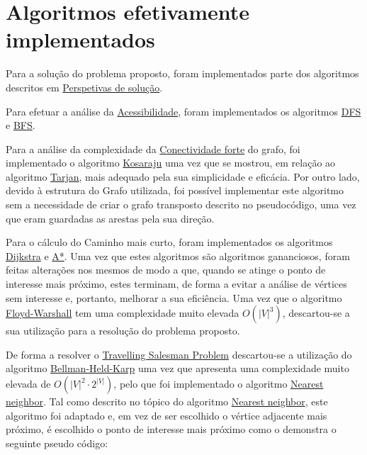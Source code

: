 \documentclass[12pt,a4paper]{report}
\begin{document}
\chapter{Algoritmos efetivamente implementados}
\label{implementedAlgos}
Para a solução do problema proposto, foram implementados parte dos algoritmos descritos em \hyperref[perspetivas]{Perspetivas de solução}. \par

Para efetuar a análise da \hyperref[perspetivas:acessibilidade]{Acessibilidade}, foram implementados os algoritmos \hyperref[algo:dfs]{DFS} e \hyperref[algo:bfs]{BFS}. \par

Para a análise da complexidade da \hyperref[perspetivas:conectividadeforte]{Conectividade forte} do grafo, foi implementado o algoritmo \hyperref[algo:kosaraju]{Kosaraju} uma vez que 
se mostrou, em relação ao algoritmo \hyperref[algo:tarjan]{Tarjan}, mais adequado pela sua simplicidade e eficácia. Por outro lado, devido à
estrutura do Grafo utilizada, foi possível implementar este algoritmo sem a necessidade de criar o grafo transposto descrito no pseudocódigo,
uma vez que eram guardadas as arestas pela sua direção. \par

Para o cálculo do Caminho mais curto, foram implementados os algoritmos \hyperref[algo:dijkstra]{Dijkstra} e \hyperref[algo:astar]{A*}. 
Uma vez que estes algoritmos são algoritmos gananciosos, foram feitas alterações nos mesmos de modo a que, quando se atinge o ponto de
interesse mais próximo, estes terminam, de forma a evitar a análise de vértices sem interesse e, portanto, melhorar a sua eficiência.
Uma vez que o algoritmo \hyperref[algo:floydwarshall]{Floyd-Warshall} tem uma complexidade muito elevada \( O(|V|^3) \), descartou-se a sua utilização
para a resolução do problema proposto. \par

De forma a resolver o \hyperref[perspetivas:tsp]{Travelling Salesman Problem} descartou-se a utilização do algoritmo \hyperref[algo:bellmanheldkarp]{Bellman-Held-Karp} uma vez que apresenta
uma complexidade muito elevada de \( O(|V|^2 \cdot 2^{|V|}) \), pelo que foi implementado o algoritmo \hyperref[algo:nn]{Nearest neighbor}.
Tal como descrito no tópico do algoritmo \hyperref[algo:nn]{Nearest neighbor}, este algoritmo foi adaptado e, em vez de ser escolhido o vértice adjacente
mais próximo, é escolhido o ponto de interesse mais próximo como o demonstra o seguinte pseudo código: \par
\end{document}
